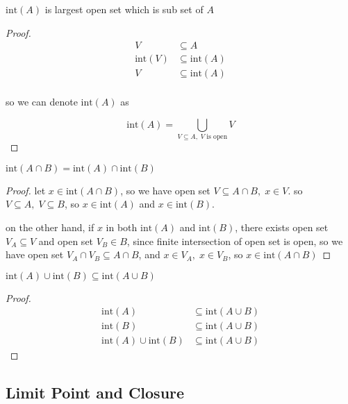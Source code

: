 \documentclass[11pt,a4paper]{article}
\begin{document}
\begin{corollary}
   $\text{int}(A)$ is largest open set which is sub set of $A$
\end{corollary}

\begin{proof}
    \begin{align*}
        V &\subseteq A \\
        \text{int}(V) &\subseteq \text{int}(A) \\
        V &\subseteq \text{int}(A) \\
    \end{align*}

    so we can denote $\text{int}(A)$ as

    \[
        \text{int}(A) = \bigcup_{V \subseteq A,\; V\;\text{is open}}V
    \]
\end{proof}


\begin{lem}
$\text{int}(A \cap B) = \text{int}(A) \cap \text{int}(B)$

\end{lem}

\begin{proof}
    let $x \in \text{int}(A \cap B)$, so we have open set $V \subseteq A \cap B,\; x \in V$. so 
    $V \subseteq A,\; V \subseteq B$, so $x \in \text{int}(A)$ and $x \in \text{int}(B)$. 

    on the other hand, if $x$ in both $\text{int}(A)$ and $\text{int}(B)$, there exists open set $V_A \subseteq V$
    and open set $V_B \in B$, since finite intersection of open set is open, so we have open set $V_A \cap V_B \subseteq A \cap B$,
    and $x \in V_A,\; x \in V_B$, so $x \in \text{int}(A \cap B)$
\end{proof}


\begin{lem}
$\text{int}(A) \cup \text{int}(B)  \subseteq \text{int}(A \cup B)$
\end{lem}

\begin{proof}
\begin{align*}
    \text{int}(A) &\subseteq \text{int}(A \cup B) \\
    \text{int}(B) &\subseteq \text{int}(A \cup B) \\
\text{int}(A) \cup \text{int}(B) & \subseteq \text{int}(A \cup B)
\end{align*}
\end{proof}

\subsection{Limit Point and Closure}
\end{document}
